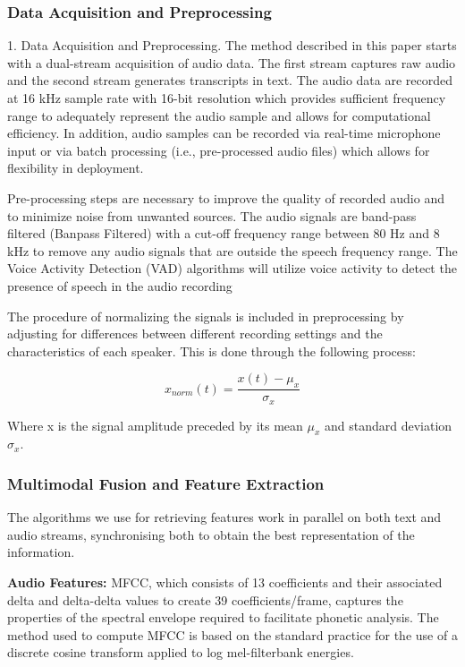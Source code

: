 \documentclass[conference]{IEEEtran}
\begin{document}
\subsubsection{Data Acquisition and Preprocessing}

1. Data Acquisition and Preprocessing. The method described in this paper starts with a dual-stream acquisition of audio data. The first stream captures raw audio and the second stream generates transcripts in text. The audio data are recorded at 16 kHz sample rate with 16-bit resolution which provides sufficient frequency range to adequately represent the audio sample and allows for computational efficiency. In addition, audio samples can be recorded via real-time microphone input or via batch processing (i.e., pre-processed audio files) which allows for flexibility in deployment.

Pre-processing steps are necessary to improve the quality of recorded audio and to minimize noise from unwanted sources. The audio signals are band-pass filtered (Banpass Filtered) with a cut-off frequency range between 80 Hz and 8 kHz to remove any audio signals that are outside the speech frequency range. The Voice Activity Detection (VAD) algorithms will utilize voice activity to detect the presence of speech in the audio recording


The procedure of normalizing the signals is included in preprocessing by adjusting for differences between different recording settings and the characteristics of each speaker. This is done through the following process:

\begin{equation}
x_{norm}(t) = \frac{x(t) - \mu_x}{\sigma_x}
\end{equation}

Where x is the signal amplitude preceded by its mean  $\mu_x$ and standard deviation $\sigma_x$.


\subsubsection{Multimodal Fusion and Feature Extraction}

The algorithms we use for retrieving features work in parallel on both text and audio streams, synchronising both to obtain the best representation of the information.

\textbf{Audio Features:} MFCC, which consists of 13 coefficients and their associated delta and delta-delta values to create 39 coefficients/frame, captures the properties of the spectral envelope required to facilitate phonetic analysis. The method used to compute MFCC is based on the standard practice for the use of a discrete cosine transform applied to log mel-filterbank energies.
\end{document}
